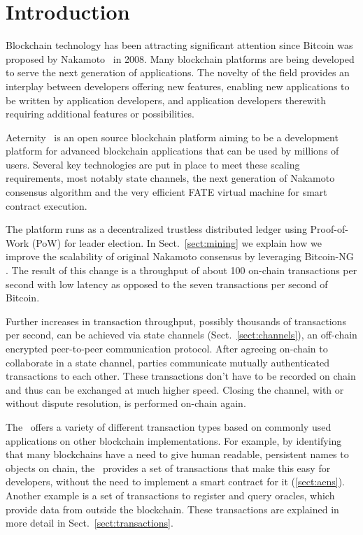 \section{Introduction}

Blockchain technology has been attracting significant attention since Bitcoin
was proposed by Nakamoto~\cite{SN} in 2008.
Many blockchain platforms are being developed to serve the next generation of
applications. The novelty of the field provides an interplay between developers
offering new features, enabling new applications to be written by application
developers, and application developers therewith requiring additional features
or possibilities.

Aeternity~\cite{AE,UlfWigerCodeMesh2018} is an open source blockchain
platform aiming to be a development platform for advanced blockchain
applications that can be used by millions of users. Several key technologies
are put in place to meet these scaling requirements, most notably state
channels, the next generation of Nakamoto consensus algorithm and the very
efficient FATE virtual machine for smart contract execution.

The platform runs as a decentralized trustless distributed ledger using
Proof-of-Work (PoW) \cite{dwork1992pricing,back1997hashcash,Tromp2015CuckooCA}
for leader election.
In Sect.~\ref{sect:mining} we explain how we improve the scalability of
original Nakamoto consensus \cite{SN} by leveraging Bitcoin-NG
\cite{Eyal:2016:BSB:2930611.2930615}. The result of this change
is a throughput of about 100 on-chain transactions per second with
low latency as opposed to the seven transactions per second of Bitcoin.

Further increases in transaction throughput, possibly thousands of
transactions per second, can be achieved via state channels (Sect.\
\ref{sect:channels}),
an off-chain encrypted peer-to-peer communication protocol. After
agreeing on-chain to collaborate in a state channel, parties communicate
mutually authenticated transactions to each other. These transactions don't
have to be recorded on chain and thus can be exchanged at much higher
speed. Closing the channel, with or without dispute resolution, is performed
on-chain again.

The \blockchain\ offers a variety of different transaction types
based on commonly used applications on other blockchain implementations.
For example, by identifying that many blockchains have a need to give human
readable, persistent names to objects on chain, the \blockchain\ provides a
set of transactions that make this easy for developers, without the need to
implement a smart contract for it (\ref{sect:aens}). Another example is a set
of transactions to register and query oracles, which provide data from outside
the blockchain.
These transactions are explained in more detail in Sect.\
\ref{sect:transactions}.

